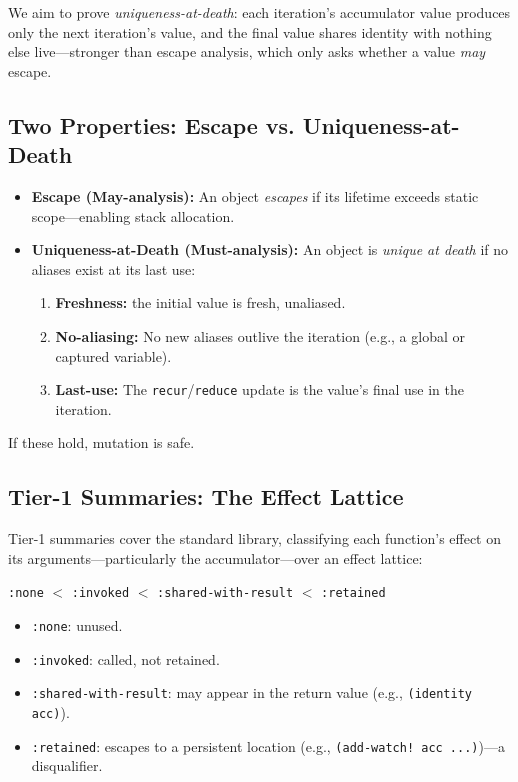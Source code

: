 \documentclass[sigplan,review,anonymous]{acmart}
\begin{document}
We aim to prove \emph{uniqueness-at-death}: each iteration's accumulator value produces only the next iteration's value, and the final value shares identity with nothing else live---stronger than escape analysis, which only asks whether a value \emph{may} escape.

\subsection{Two Properties: Escape vs. Uniqueness-at-Death}

\begin{itemize}
    \item \textbf{Escape (May-analysis):} An object \emph{escapes} if its lifetime exceeds static scope---enabling stack allocation.
    \item \textbf{Uniqueness-at-Death (Must-analysis):} An object is \emph{unique at death} if no aliases exist at its last use:
    \begin{enumerate}
        \item \textbf{Freshness:} the initial value is fresh, unaliased.
        \item \textbf{No-aliasing:} No new aliases outlive the iteration (e.g., a global or captured variable).
        \item \textbf{Last-use:} The \texttt{recur}/\texttt{reduce} update is the value's final use in the iteration.
    \end{enumerate}
\end{itemize}

If these hold, mutation is safe.

\subsection{Tier-1 Summaries: The Effect Lattice}
\label{sec:tier1}

Tier-1 summaries cover the standard library, classifying each function's effect on its arguments---particularly the accumulator---over an effect lattice:

\texttt{:none} $<$ \texttt{:invoked} $<$ \texttt{:shared-with-result} $<$ \texttt{:retained}

\begin{itemize}
    \item \texttt{:none}: unused.
    \item \texttt{:invoked}: called, not retained.
    \item \texttt{:shared-with-result}: may appear in the return value (e.g., \texttt{(identity acc)}).
    \item \texttt{:retained}: escapes to a persistent location (e.g., \texttt{(add-watch! acc ...)})---a disqualifier.
\end{itemize}
\end{document}
